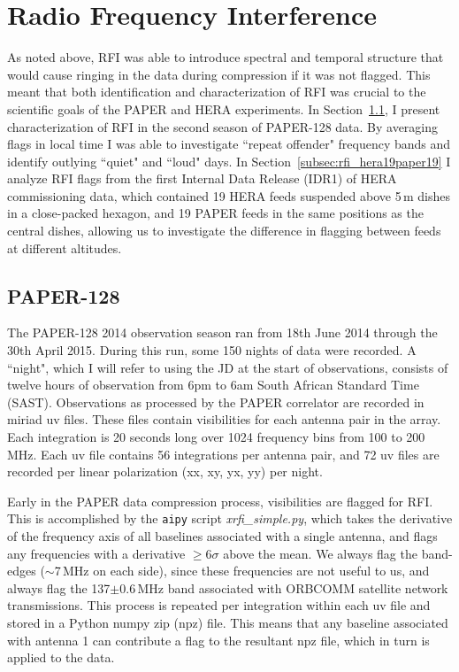 \section{Radio Frequency Interference}
\label{sec:RFI}

As noted above, RFI was able to introduce spectral and temporal structure that would cause ringing in the data during compression if it was not flagged. This meant that both identification and characterization of RFI was crucial to the scientific goals of the PAPER and HERA experiments. In Section~\ref{subsec:rfi_paper128}, I present characterization of RFI in the second season of PAPER-128 data. By averaging flags in local time I was able to investigate ``repeat offender" frequency bands and identify outlying ``quiet" and ``loud" days.
In Section~\ref{subsec:rfi_hera19paper19} I analyze RFI flags from the first Internal Data Release (IDR1) of HERA commissioning data, which contained 19 HERA feeds suspended above 5\,m dishes in a close-packed hexagon, and 19 PAPER feeds in the same positions as the central dishes, allowing us to investigate the difference in flagging between feeds at different altitudes.

\subsection{PAPER-128}
\label{subsec:rfi_paper128}

The PAPER-128 2014 observation season ran from 18th June 2014 through the 30th April 2015. During this run, some 150 nights of data were recorded. A ``night", which I will refer to using the JD at the start of observations, consists of twelve hours of observation from 6pm to 6am South African Standard Time (SAST). Observations as processed by the PAPER correlator are recorded in {\sc miriad} uv files. These files contain visibilities for each antenna pair in the array. Each integration is 20 seconds long over 1024 frequency bins from 100 to 200\,MHz. Each uv file contains 56 integrations per antenna pair, and 72 uv files are recorded per linear polarization (xx, xy, yx, yy) per night.

Early in the PAPER data compression process, visibilities are flagged for RFI. This is accomplished by the {\tt aipy} script \textit{xrfi\_simple.py}, which takes the derivative of the frequency axis of all baselines associated with a single antenna, and flags any frequencies with a derivative $\geqslant 6\sigma$ above the mean. We always flag the band-edges ($\sim$7\,MHz on each side), since these frequencies are not useful to us, and always flag the 137$\pm$0.6\,MHz band associated with ORBCOMM satellite network transmissions. This process is repeated per integration within each uv file and stored in a Python numpy zip (npz) file. This means that any baseline associated with antenna 1 can contribute a flag to the resultant npz file, which in turn is applied to the data.

